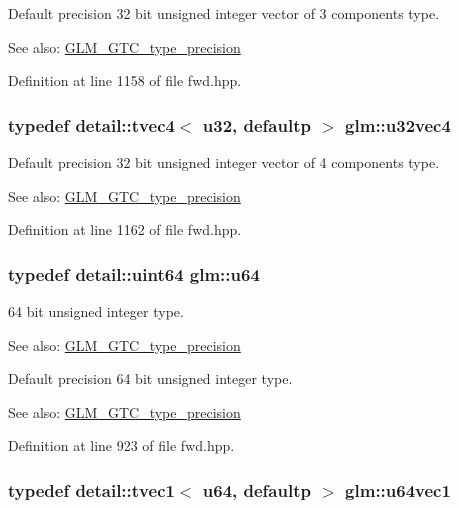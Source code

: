 Default precision 32 bit unsigned integer vector of 3 components type. \begin{Desc}
\item[See also:]\hyperlink{group__gtc__type__precision}{GLM\_\-GTC\_\-type\_\-precision} \end{Desc}


Definition at line 1158 of file fwd.hpp.\hypertarget{group__gtc__type__precision_g7e4574f8327a2f576baf2617343d0170}{
\subsubsection[u32vec4]{\setlength{\rightskip}{0pt plus 5cm}typedef detail::tvec4$<$ u32, defaultp $>$ {\bf glm::u32vec4}}}
\label{group__gtc__type__precision_g7e4574f8327a2f576baf2617343d0170}


Default precision 32 bit unsigned integer vector of 4 components type. \begin{Desc}
\item[See also:]\hyperlink{group__gtc__type__precision}{GLM\_\-GTC\_\-type\_\-precision} \end{Desc}


Definition at line 1162 of file fwd.hpp.\hypertarget{group__gtc__type__precision_g71cedd4972f9cb1a5e14dfe5ab83ecd7}{
\subsubsection[u64]{\setlength{\rightskip}{0pt plus 5cm}typedef detail::uint64 {\bf glm::u64}}}
\label{group__gtc__type__precision_g71cedd4972f9cb1a5e14dfe5ab83ecd7}


64 bit unsigned integer type. \begin{Desc}
\item[See also:]\hyperlink{group__gtc__type__precision}{GLM\_\-GTC\_\-type\_\-precision}\end{Desc}
Default precision 64 bit unsigned integer type. \begin{Desc}
\item[See also:]\hyperlink{group__gtc__type__precision}{GLM\_\-GTC\_\-type\_\-precision} \end{Desc}


Definition at line 923 of file fwd.hpp.\hypertarget{group__gtc__type__precision_g7d5145019ad749f4becd39ce8e786a5f}{
\subsubsection[u64vec1]{\setlength{\rightskip}{0pt plus 5cm}typedef detail::tvec1$<$ u64, defaultp $>$ {\bf glm::u64vec1}}}
\label{group__gtc__type__precision_g7d5145019ad749f4becd39ce8e786a5f}


